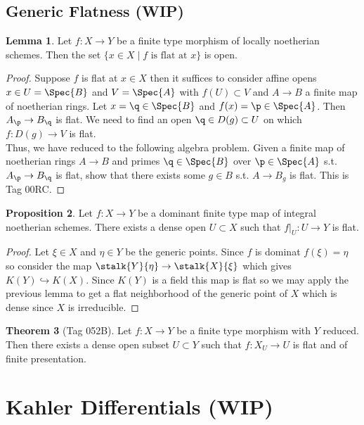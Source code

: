 \documentclass[12pt]{extarticle}
\theoremstyle{definition}
\newtheorem{theorem}{Theorem}[section]
\newtheorem{lemma}[theorem]{Lemma}
\newtheorem{proposition}[theorem]{Proposition}
\newcommand{\embed}{\hookrightarrow}
\begin{document}
\subsection{Generic Flatness (WIP)}

\begin{lemma}
Let $f : X \to Y$ be a finite type morphism of locally noetherian schemes. Then the set $\{ x \in X  \mid f \text{ is flat at } x \}$ is open.
\end{lemma}

\begin{proof}
Suppose $f$ is flat at $x \in X$ then it suffices to consider affine opens $x \in U = \Spec{B}$ and $V = \Spec{A}$ with $f(U) \subset V$ and $A \to B$ a finite map of noetherian rings. Let $x = \q \in \Spec{B}$ and $f(x) = \p \in \Spec{A}$. Then $A_\p \to B_\q$ is flat. We need to find an open $\q \in D(g) \subset U$ on which $f : D(g) \to V$ is flat.
\bigskip\\
Thus, we have reduced to the following algebra problem. Given a finite map of noetherian rings $A \to B$ and primes $\q \in \Spec{B}$ over $\p \in \Spec{A}$ s.t. $A_\p \to B_\q$ is flat, show that there exists some $g \in B$ s.t. $A \to B_g$ is flat. This is Tag 00RC.
\end{proof}

\begin{proposition}
Let $f : X \to Y$ be a dominant finite type map of integral noetherian schemes. There exists a dense open $U \subset X$ such that $f|_U : U \to Y$ is flat. 
\end{proposition}

\begin{proof}
Let $\xi \in X$ and $\eta \in Y$ be the generic points. Since $f$ is dominat $f(\xi) = \eta$ so consider the map $\stalk{Y}{\eta} \to \stalk{X}{\xi}$ which gives $K(Y) \embed K(X)$. Since $K(Y)$ is a field this map is flat so we may apply the previous lemma to get a flat neighborhood of the generic point of $X$ which is dense since $X$ is irreducible. 
\end{proof}

\begin{theorem}[Tag 052B]
Let $f : X \to Y$ be a finite type morphism with $Y$ reduced. Then there exists a dense open subset $U \subset Y$ such that $f : X_U \to U$ is flat and of finite presentation. 
\end{theorem}

\section{Kahler Differentials (WIP)}
\end{document}
